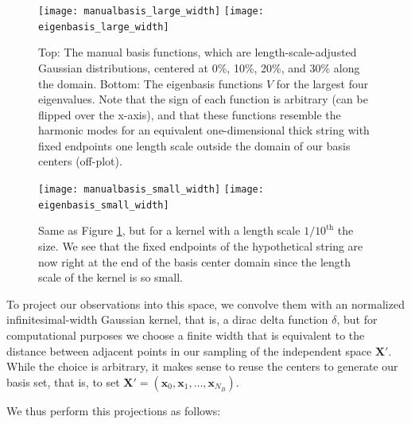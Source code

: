 \documentclass{article}
\begin{document}
\begin{figure}
    \begin{center}
    \texttt{[image: manualbasis\_large\_width]}
    \texttt{[image: eigenbasis\_large\_width]}
    \caption{Top: The manual basis functions, which are length-scale-adjusted Gaussian distributions, centered at 0\%, 10\%, 20\%, and 30\% along the domain. Bottom: The eigenbasis functions $V$ for the largest four eigenvalues. Note that the sign of each function is arbitrary (can be flipped over the x-axis), and that these functions resemble the harmonic modes for an equivalent one-dimensional thick string with fixed endpoints one length scale outside the domain of our basis centers (off-plot).}
    \label{fig:basis_large_width}
    \end{center}
\end{figure}

\begin{figure}
    \begin{center}
    \texttt{[image: manualbasis\_small\_width]}
    \texttt{[image: eigenbasis\_small\_width]}
    \caption{Same as Figure \ref{fig:basis_large_width}, but for a kernel with a length scale $1/10^{\text{th}}$ the size. We see that the fixed endpoints of the hypothetical string are now right at the end of the basis center domain since the length scale of the kernel is so small.}
    \label{fig:basis_small_width}
    \end{center}
\end{figure}

To project our observations into this space, we convolve them with an normalized infinitesimal-width Gaussian kernel, that is, a dirac delta function $\delta$, but for computational purposes we choose a finite width that is equivalent to the distance between adjacent points in our sampling of the independent space $\mathbf{X}'$. While the choice is arbitrary, it makes sense to reuse the centers  to generate our basis set, that is, to set $\mathbf{X}'=(\mathbf{x}_0,\mathbf{x}_1,\dots,\mathbf{x}_{N_B})$.

We thus perform this projections as follows: 
\end{document}
